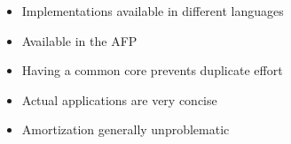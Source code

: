 \begin{frame}
  \begin{itemize}[<+->]
  	\item Implementations available in different languages
    \item Available in the AFP
    \item Having a common core prevents duplicate effort
    \item Actual applications are very concise
    \item Amortization generally unproblematic
  \end{itemize}
\end{frame}